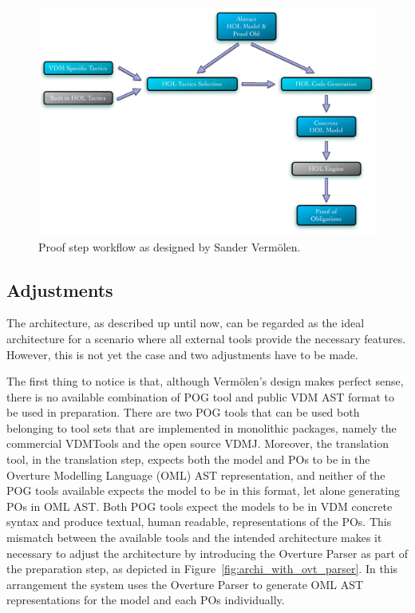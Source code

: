 \documentclass[]{article}
\begin{document}
\begin{figure}
  \begin{center}
  \includegraphics[width=\textwidth]{images/pic_proof.pdf}
  \caption[Proof workflow]{Proof step workflow as designed by Sander Verm\"olen.}
  \label{fig:arch_proof}
  \end{center}
\end{figure}


\subsection{Adjustments}
\label{sub:adjustments}

The architecture, as described up until now, can be regarded as the ideal architecture for a scenario where all external tools provide the necessary features.
However, this is not yet the case and two adjustments have to be made.

The first thing to notice is that, although Verm\"olen's design makes perfect sense, there is no available combination of POG tool and public VDM AST format to be used in preparation.
There are two POG tools that can be used both belonging to tool sets that are implemented in monolithic packages, namely the commercial VDMTools and the open source VDMJ.
Moreover, the translation tool, in the translation step, expects both the model and POs to be in the Overture Modelling Language (OML) AST representation, and neither of the POG tools available expects the model to be in this format, let alone generating POs in OML AST.
Both POG tools expect the models to be in VDM concrete syntax and produce textual, human readable, representations of the POs.
This mismatch between the available tools and the intended architecture makes it necessary to adjust the architecture by introducing the Overture Parser as part of the preparation step, as depicted in Figure~\ref{fig:archi_with_ovt_parser}.
In this arrangement the system uses the Overture Parser to generate OML AST representations for the model and each POs individually.
\end{document}
